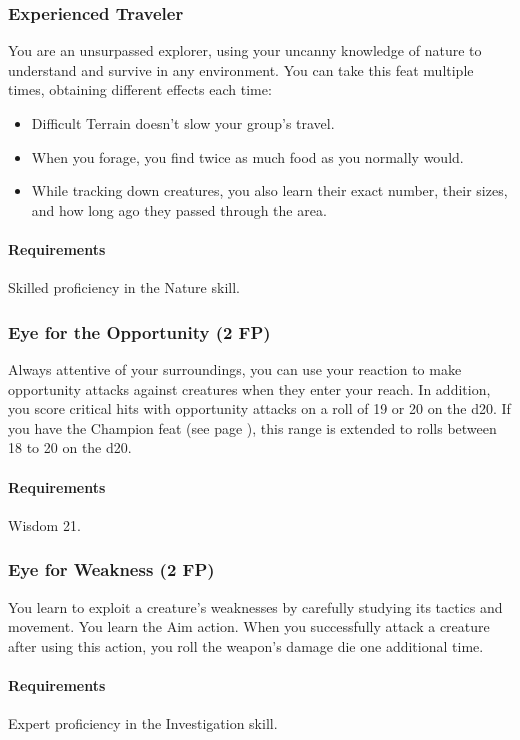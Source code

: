 \subsubsection{Experienced Traveler} \label{feat::experiencedtraveler}
    You are an unsurpassed explorer, using your uncanny knowledge of nature to understand and survive in any environment.
    You can take this feat multiple times, obtaining different effects each time:
    \begin{itemize}
        \item Difficult Terrain doesn't slow your group's travel.
        \item When you forage, you find twice as much food as you normally would.
        \item While tracking down creatures, you also learn their exact number, their sizes, and how long ago they passed through the area.
    \end{itemize}
    \paragraph{Requirements} Skilled proficiency in the Nature skill.
\subsubsection{Eye for the Opportunity (2 FP)} \label{feat::eyefortheopportunity}
    Always attentive of your surroundings, you can use your reaction to make opportunity attacks against creatures when they enter your reach.
    In addition, you score critical hits with opportunity attacks on a roll of 19 or 20 on the d20.
    If you have the Champion feat (see page \pageref{feat::champion}), this range is extended to rolls between 18 to 20 on the d20.
    \paragraph{Requirements} Wisdom 21.
\subsubsection{Eye for Weakness (2 FP)} \label{feat::eyeforweakness}
    You learn to exploit a creature's weaknesses by carefully studying its tactics and movement.
    You learn the Aim action.
    When you successfully attack a creature after using this action, you roll the weapon's damage die one additional time.
    \paragraph{Requirements} Expert proficiency in the Investigation skill.

